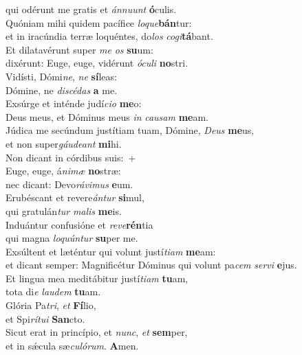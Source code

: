 \evenverse qui odérunt me gratis et \textit{án}\textit{nu}\textit{unt} \textbf{ó}culis.\\
\oddverse Quóniam mihi quidem pacífice \textit{lo}\textit{que}\textbf{bán}tur:~\*\\
\oddverse et in iracúndia terræ loquéntes, do\textit{los} \textit{co}\textit{gi}\textbf{tá}bant.\\
\evenverse Et dilatavérunt super \textit{me} \textit{os} \textbf{su}um:~\*\\
\evenverse dixérunt: Euge, euge, vidérunt \textit{ó}\textit{cu}\textit{li} \textbf{no}stri.\\
\oddverse Vidísti, Dómi\textit{ne}, \textit{ne} \textbf{sí}leas:~\*\\
\oddverse Dómine, ne \textit{di}\textit{scé}\textit{das} \textbf{a} me.\\
\evenverse Exsúrge et inténde judí\textit{ci}\textit{o} \textbf{me}o:~\*\\
\evenverse Deus meus, et Dóminus meus \textit{in} \textit{cau}\textit{sam} \textbf{me}am.\\
\oddverse Júdica me secúndum justítiam tuam, Dómine, \textit{De}\textit{us} \textbf{me}us,~\*\\
\oddverse et non super\textit{gáu}\textit{de}\textit{ant} \textbf{mi}hi.\\
\evenverse Non dicant in córdibus suis:~+\\
\evenverse  Euge, euge, á\textit{ni}\textit{mæ} \textbf{no}stræ:~\*\\
\evenverse nec dicant: Devo\textit{rá}\textit{vi}\textit{mus} \textbf{e}um.\\
\oddverse Erubéscant et revere\textit{án}\textit{tur} \textbf{si}mul,~\*\\
\oddverse qui gratulán\textit{tur} \textit{ma}\textit{lis} \textbf{me}is.\\
\evenverse Induántur confusióne et \textit{re}\textit{ve}\textbf{rén}tia~\*\\
\evenverse qui magna \textit{lo}\textit{quún}\textit{tur} \textbf{su}per me.\\
\oddverse Exsúltent et læténtur qui volunt justí\textit{ti}\textit{am} \textbf{me}am:~\*\\
\oddverse et dicant semper: Magnificétur Dóminus qui volunt pa\textit{cem} \textit{ser}\textit{vi} \textbf{e}jus.\\
\evenverse Et lingua mea meditábitur justí\textit{ti}\textit{am} \textbf{tu}am,~\*\\
\evenverse tota di\textit{e} \textit{lau}\textit{dem} \textbf{tu}am.\\
\oddverse Glória Pa\textit{tri}, \textit{et} \textbf{Fí}lio,~\*\\
\oddverse et Spi\textit{rí}\textit{tu}\textit{i} \textbf{San}cto.\\
\evenverse Sicut erat in princípio, et \textit{nunc}, \textit{et} \textbf{sem}per,~\*\\
\evenverse et in sǽcula sæ\textit{cu}\textit{ló}\textit{rum}. \textbf{A}men.\\
